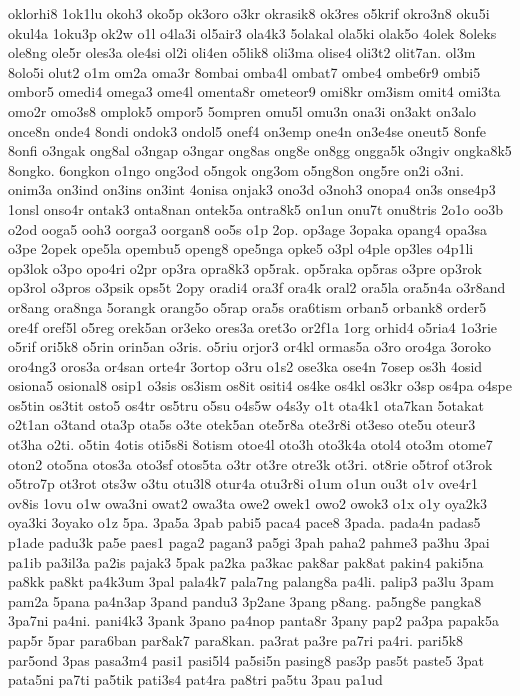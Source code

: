 {oklorhi8 1ok1lu okoh3 oko5p ok3oro o3kr okrasik8 ok3res o5krif okro3n8
oku5i okul4a 1oku3p ok2w o1l o4la3i ol5air3 ola4k3 5olakal ola5ki olak5o
4olek 8oleks ole8ng ole5r oles3a ole4si ol2i oli4en o5lik8 oli3ma olise4
oli3t2 olit7an. ol3m 8olo5i olut2 o1m om2a oma3r 8ombai omba4l ombat7
ombe4 ombe6r9 ombi5 ombor5 omedi4 omega3 ome4l omenta8r ometeor9 omi8kr
om3ism omit4 omi3ta omo2r omo3s8 omplok5 ompor5 5ompren omu5l omu3n ona3i
on3akt on3alo once8n onde4 8ondi ondok3 ondol5 onef4 on3emp one4n on3e4se
oneut5 8onfe 8onfi o3ngak ong8al o3ngap o3ngar ong8as ong8e on8gg ongga5k
o3ngiv ongka8k5 8ongko. 6ongkon o1ngo ong3od o5ngok ong3om o5ng8on ong5re
on2i o3ni. onim3a on3ind on3ins on3int 4onisa onjak3 ono3d o3noh3 onopa4
on3s onse4p3 1onsl onso4r ontak3 onta8nan ontek5a ontra8k5 on1un onu7t
onu8tris 2o1o oo3b o2od ooga5 ooh3 oorga3 oorgan8 oo5s o1p 2op. op3age
3opaka opang4 opa3sa o3pe 2opek ope5la opembu5 openg8 ope5nga opke5 o3pl
o4ple op3les o4p1li op3lok o3po opo4ri o2pr op3ra opra8k3 op5rak. op5raka
op5ras o3pre op3rok op3rol o3pros o3psik ops5t 2opy oradi4 ora3f ora4k
oral2 ora5la ora5n4a o3r8and or8ang ora8nga 5orangk orang5o o5rap ora5s
ora6tism orban5 orbank8 order5 ore4f oref5l o5reg orek5an or3eko ores3a
oret3o or2f1a 1org orhid4 o5ria4 1o3rie o5rif ori5k8 o5rin orin5an o3ris.
o5riu orjor3 or4kl ormas5a o3ro oro4ga 3oroko oro4ng3 oros3a or4san orte4r
3ortop o3ru o1s2 ose3ka ose4n 7osep os3h 4osid osiona5 osional8 osip1
o3sis os3ism os8it ositi4 os4ke os4kl os3kr o3sp os4pa o4spe os5tin os3tit
osto5 os4tr os5tru o5su o4s5w o4s3y o1t ota4k1 ota7kan 5otakat o2t1an
o3tand ota3p ota5s o3te otek5an ote5r8a ote3r8i ot3eso ote5u oteur3 ot3ha
o2ti. o5tin 4otis oti5s8i 8otism otoe4l oto3h oto3k4a otol4 oto3m otome7
oton2 oto5na otos3a oto3sf otos5ta o3tr ot3re otre3k ot3ri. ot8rie o5trof
ot3rok o5tro7p ot3rot ots3w o3tu otu3l8 otur4a otu3r8i o1um o1un ou3t o1v
ove4r1 ov8is 1ovu o1w owa3ni owat2 owa3ta owe2 owek1 owo2 owok3 o1x o1y
oya2k3 oya3ki 3oyako o1z 5pa. 3pa5a 3pab pabi5 paca4 pace8 3pada. pada4n
padas5 p1ade padu3k pa5e paes1 paga2 pagan3 pa5gi 3pah paha2 pahme3 pa3hu
3pai pa1ib pa3il3a pa2is pajak3 5pak pa2ka pa3kac pak8ar pak8at pakin4
paki5na pa8kk pa8kt pa4k3um 3pal pala4k7 pala7ng palang8a pa4li. palip3
pa3lu 3pam pam2a 5pana pa4n3ap 3pand pandu3 3p2ane 3pang p8ang. pa5ng8e
pangka8 3pa7ni pa4ni. pani4k3 3pank 3pano pa4nop panta8r 3pany pap2 pa3pa
papak5a pap5r 5par para6ban par8ak7 para8kan. pa3rat pa3re pa7ri pa4ri.
pari5k8 par5ond 3pas pasa3m4 pasi1 pasi5l4 pa5si5n pasing8 pas3p pas5t
paste5 3pat pata5ni pa7ti pa5tik pati3s4 pat4ra pa8tri pa5tu 3pau pa1ud
}

